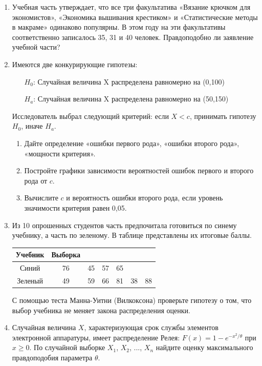 \documentclass[12pt, a4paper]{article}\usepackage[]{graphicx}\usepackage[]{color}
\begin{document}
\begin{enumerate}
\begin{enumerate}
		\end{enumerate}
		\item Учебная часть утверждает, что все три факультатива «Вязание крючком для экономистов», «Экономика вышивания крестиком» и «Статистические методы в макраме» одинаково популярны. В этом году на эти факультативы соответственно записалось 35, 31 и 40 человек. Правдоподобно ли заявление учебной части?
		\item Имеются две конкурирующие гипотезы:
		\begin{enumerate}
			\item[$H_0$:] Случайная величина X распределена равномерно на (0,100)
			\item[$H_a$:] Случайная величина X распределена равномерно на (50,150)
		\end{enumerate}
		Исследователь выбрал следующий критерий: если $X<c$, принимать гипотезу $H_0$, иначе  $H_a$.
		\begin{enumerate}
			\item Дайте определение «ошибки первого рода», «ошибки второго рода», «мощности критерия».
			\item Постройте графики зависимости вероятностей ошибок первого и второго рода от $c$.
			\item Вычислите $c$ и вероятность ошибки второго рода, если уровень значимости критерия равен 0,05.
		\end{enumerate}
		\item Из 10 опрошенных студентов часть предпочитала готовиться по синему учебнику, а часть по зеленому. В таблице представлены их итоговые баллы.


		\begin{tabular}{c|cccccc}
			Учебник & Выборка &  &  &   &   &   \\
			\hline
			Синий & 76 & 45 & 57 & 65 &   &   \\
			Зеленый & 49 & 59 & 66 & 81 & 38 & 88 \\
		\end{tabular}


		С помощью теста Манна-Уитни (Вилкоксона) проверьте гипотезу о том, что выбор учебника не меняет закона распределения оценки.

		\item Случайная величина $X$, характеризующая срок службы элементов электронной аппаратуры, имеет распределение Релея: $F(x)=1-e^{-x^2/\theta}$ при $x\geq 0$. По случайной выборке $X_1$, $X_2$, ..., $X_n$ найдите оценку максимального правдоподобия параметра $\theta$.


\end{enumerate}
\end{document}
